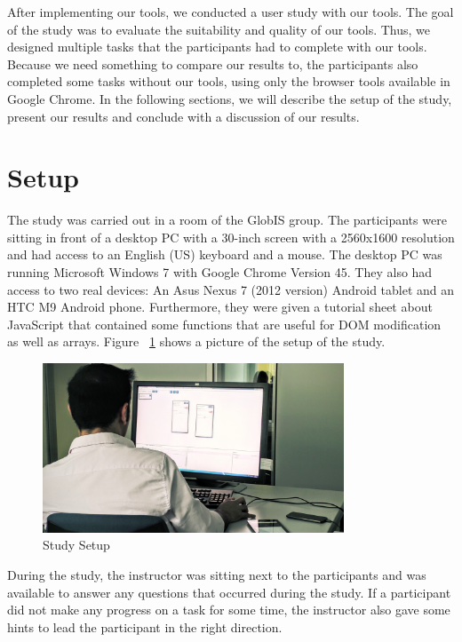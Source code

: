 After implementing our tools, we conducted a user study with our tools. The goal of the study was to evaluate the suitability and quality of our tools. Thus, we designed multiple tasks that the participants had to complete with our tools. Because we need something to compare our results to, the participants also completed some tasks without our tools, using only the browser tools available in Google Chrome. In the following sections, we will describe the setup of the study, present our results and conclude with a discussion of our results.

\section{Setup}

The study was carried out in a room of the GlobIS group. The participants were sitting in front of a desktop PC with a 30-inch screen with a 2560x1600 resolution and had access to an English (US) keyboard and a mouse. The desktop PC was running Microsoft Windows 7 with Google Chrome Version 45. They also had access to two real devices: An Asus Nexus 7 (2012 version) Android tablet and an HTC M9 Android phone. Furthermore, they were given a tutorial sheet about JavaScript that contained some functions that are useful for DOM modification as well as arrays. Figure ~\ref{fig:study_setup} shows a picture of the setup of the study.

\begin{figure}[H]
  \centering
    \includegraphics[width=0.8\textwidth]{images/study_setup2.png}
	\caption{Study Setup}
	\label{fig:study_setup}
\end{figure}

During the study, the instructor was sitting next to the participants and was available to answer any questions that occurred during the study. If a participant did not make any progress on a task for some time, the instructor also gave some hints to lead the participant in the right direction.

